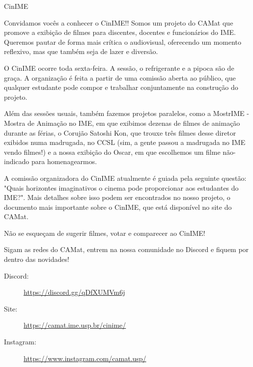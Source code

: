 \filbreak
\begin{subsecao}{CinIME}


Convidamos vocês a conhecer o CinIME!! Somos um projeto do CAMat que promove a
exibição de filmes para discentes, docentes e funcionários do IME. Queremos pautar
de forma mais crítica o audiovisual, oferecendo um momento reflexivo, mas que 
também seja de lazer e diversão.

O CinIME ocorre toda sexta-feira. A sessão, o refrigerante e a pipoca são de graça. 
A organização é feita a partir de uma comissão aberta ao público, que
qualquer estudante pode compor e trabalhar conjuntamente na construção do projeto. 

Além das sessões usuais, também fazemos projetos paralelos, como a MostrIME - Mostra de
Animação no IME, em que exibimos dezenas de filmes de animação durante as férias, o Corujão
Satoshi Kon, que trouxe três filmes desse diretor exibidos numa madrugada, no CCSL (sim, a gente
passou a madrugada no IME vendo filmes!) e a nossa exibição do Oscar, em que escolhemos um filme
não-indicado para homenagearmos. 

A comissão organizadora do CinIME atualmente é guiada pela seguinte questão: "Quais 
horizontes imaginativos o cinema pode proporcionar aos estudantes do IME?". Mais detalhes
sobre isso podem ser encontrados no nosso projeto, o documento mais importante sobre o 
CinIME, que está disponível no site do CAMat.

Não se esqueçam de sugerir filmes, votar e comparecer ao CinIME!

Sigam as redes do CAMat, entrem na nossa comunidade no Discord e fiquem por dentro das novidades!

\begin{description}
  \item[Discord:] \url{https://discord.gg/qDfXUMVm6j}
  \item[Site:] \url{https://camat.ime.usp.br/cinime/}
  \item[Instagram:] \url{https://www.instagram.com/camat.usp/}
\end{description}

\end{subsecao}
